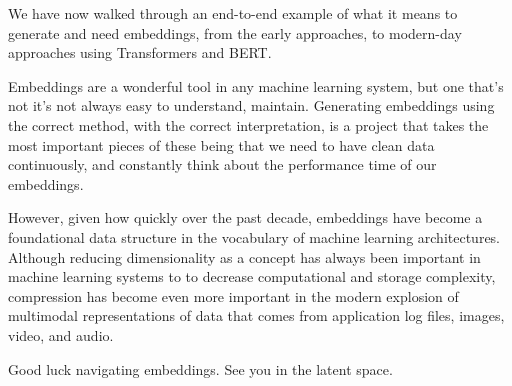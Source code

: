 \documentclass[11pt, table]{diazessay} %
\begin{document}
\begin{sloppypar}
We have now walked through an end-to-end example of what it means to generate and need embeddings, from the early approaches, to modern-day approaches using Transformers and BERT. 

Embeddings are a wonderful tool in any machine learning system, but one that's not it's not always easy to understand, maintain. Generating embeddings using the correct method, with the correct interpretation, is a project that takes  the most important pieces of these being that we need to have clean data continuously, and constantly think about the performance time of our embeddings. 

However, given how quickly over the past decade, embeddings have become a foundational data structure in the vocabulary of machine learning architectures. Although reducing dimensionality as a concept has always been important in machine learning systems to to decrease computational and storage complexity, compression has become even more important in the modern explosion of multimodal representations of data that comes from application log files, images, video, and audio. 

Good luck navigating embeddings.  See you in the latent space. 


\newpage


\newpage



\end{sloppypar}
\end{document}
